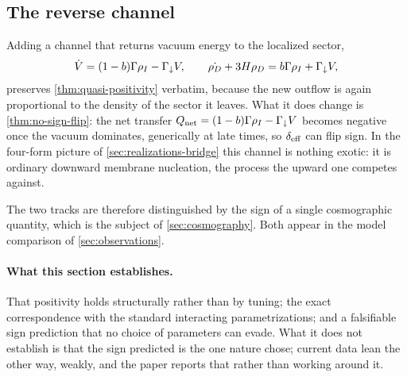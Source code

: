 \subsection{The reverse channel}\label{sec:positivity-track-b}

Adding a channel that returns vacuum energy to the localized sector,
%
\begin{equation}\label{eq:positivity-track-b}
  \dot {V}=(1-b)\Gamma\rho_{I}-\Gamma_{\downarrow} V ,
  \qquad
  \dot{\rho_{D}}+3H\rho_{D}=b\Gamma\rho_{I}+\Gamma_{\downarrow} V ,
\end{equation}
%
preserves \cref{thm:quasi-positivity} verbatim, because the new outflow is
again proportional to the density of the sector it leaves. What it does change
is \cref{thm:no-sign-flip}: the net transfer
$Q_{\mathrm{net}}=(1-b)\Gamma\rho_{I}-\Gamma_{\downarrow} V$ becomes negative once the vacuum
dominates, generically at late times, so $\delta_{\rm eff}$ can flip sign. In
the four-form picture of \cref{sec:realizations-bridge} this channel is nothing
exotic: it is ordinary downward membrane nucleation, the process the upward
one competes against.

The two tracks are therefore distinguished by the sign of a single
cosmographic quantity, which is the subject of \cref{sec:cosmography}. Both
appear in the model comparison of \cref{sec:observations}.

\paragraph{What this section establishes.}
That positivity holds structurally rather than by tuning; the exact
correspondence with the standard interacting parametrizations; and a
falsifiable sign prediction that no choice of parameters can evade. What it does
not establish is that the sign predicted is the one nature chose; current data
lean the other way, weakly, and the paper reports that rather than working
around it.

